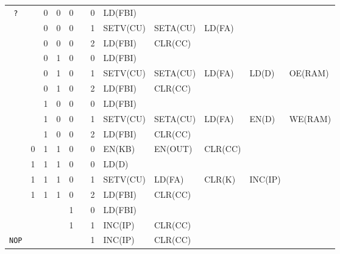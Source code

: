 \begin{footnotesize}
\begin{longtable}[c] {c|ccccc|c|lllll}
    \rowcolor{Gray}\texttt{?}       &   & 0 & 0 & 0 &   & 0  & LD(FBI)     &           &           &         &                \\
    \rowcolor{Gray}                 &   & 0 & 0 & 0 &   & 1  & SETV(CU)    & SETA(CU)  & LD(FA)    &        &                \\ 
    \rowcolor{Gray}                 &   & 0 & 0 & 0 &   & 2  & LD(FBI)     & CLR(CC)          &   &        &                \\
    \rowcolor{White}                &   & 0 & 1 & 0 &   & 0  & LD(FBI)     &           &           &         &                \\
    \rowcolor{White}                &   & 0 & 1 & 0 &   & 1  & SETV(CU)    & SETA(CU)  & LD(FA)    & LD(D)  & OE(RAM)        \\ 
    \rowcolor{White}                &   & 0 & 1 & 0 &   & 2  & LD(FBI)     & CLR(CC)          &    &        &                \\
    \rowcolor{Gray}                 &   & 1 & 0 & 0 &   & 0  & LD(FBI)     &           &           &         &                \\
    \rowcolor{Gray}                 &   & 1 & 0 & 0 &   & 1  & SETV(CU)    & SETA(CU)  & LD(FA)    & EN(D)  & WE(RAM)        \\ 
    \rowcolor{Gray}                 &   & 1 & 0 & 0 &   & 2  & LD(FBI)     &  CLR(CC)          &   &        &                \\
    \rowcolor{White}                & 0 & 1 & 1 & 0 &   & 0  & EN(KB)      & EN(OUT)   & CLR(CC)   &         &                \\ 
    \rowcolor{Gray}                 & 1 & 1 & 1 & 0 &   & 0  & LD(D)       &           &           &        &                \\ 
    \rowcolor{Gray}                 & 1 & 1 & 1 & 0 &   & 1  & SETV(CU)    & LD(FA)    & CLR(K)    & INC(IP) &                \\ 
    \rowcolor{Gray}                 & 1 & 1 & 1 & 0 &   & 2  & LD(FBI)     &  CLR(CC)        &    &        &                \\
    \rowcolor{White}                &   &   &   & 1 &   & 0  & LD(FBI)     &           &           &        &                \\ \hline
    \rowcolor{White}                &   &   &   & 1 &   & 1  & INC(IP)     & CLR(CC)   &           &        &                \\ \hline
    

    \rowcolor{White} \texttt{NOP}   &   &   &   &   &   & 1  & INC(IP)     & CLR(CC)    &           &        &                \\ \hline


\end{longtable}
\end{footnotesize}
